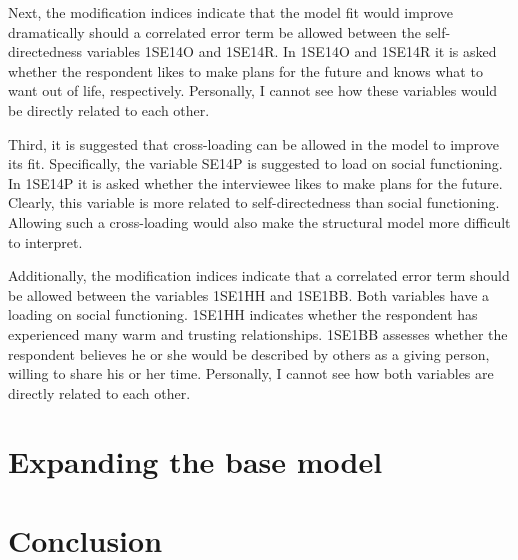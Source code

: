 \documentclass[11pt]{article}
\begin{document}
Next, the modification indices indicate that the model fit would improve
dramatically should a correlated error term be allowed between the
self-directedness variables 1SE14O and 1SE14R. In 1SE14O and 1SE14R it is asked
whether the respondent likes to make plans for the future and knows what to want
out of life, respectively. Personally, I cannot see how these variables would be
directly related to each other.

Third, it is suggested that cross-loading can be allowed in the model to improve
its fit. Specifically, the variable SE14P is suggested to load on social
functioning. In 1SE14P it is asked whether the interviewee likes to make plans
for the future. Clearly, this variable is more related to self-directedness than
social functioning. Allowing such a cross-loading would also make the structural
model more difficult to interpret.

Additionally, the modification indices indicate that a correlated error term
should be allowed between the variables 1SE1HH and 1SE1BB. Both variables have a
loading on social functioning. 1SE1HH indicates whether the respondent has
experienced many warm and trusting relationships. 1SE1BB assesses whether the
respondent believes he or she would be described by others as a giving person,
willing to share his or her time. Personally, I cannot see how both variables are
directly related to each other.

\FloatBarrier
\pagebreak
\section{Expanding the base model}

\FloatBarrier
\pagebreak
\section{Conclusion}
\end{document}
